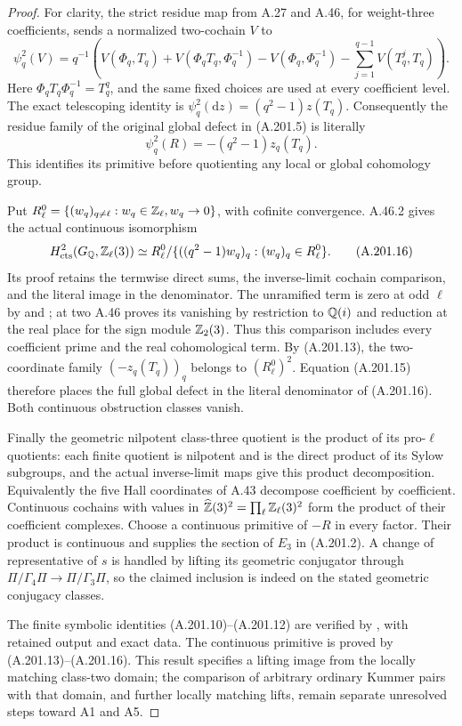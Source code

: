\begin{proof}
For clarity, the strict residue map from A.27 and A.46, for
weight-three coefficients, sends a normalized two-cochain
\(V\) to
\[
 \psi_q^2(V)=q^{-1}\left(
 V(\Phi_q,T_q)+V(\Phi_qT_q,\Phi_q^{-1})
 -V(\Phi_q,\Phi_q^{-1})
 -\sum_{j=1}^{q-1}V(T_q^j,T_q)\right).
\tag{A.201.14}
\]
Here \(\Phi_qT_q\Phi_q^{-1}=T_q^q\), and the same
fixed choices are used at every coefficient level.  The exact
telescoping identity is
\(\psi_q^2(\mathrm dz)=(q^2-1)z(T_q)\).
Consequently the residue family of the original global defect
in (A.201.5) is literally
\[
          \psi_q^2(R)=-(q^2-1)z_q(T_q).
\tag{A.201.15}
\]
This identifies its primitive before quotienting any local or
global cohomology group.

Put \(R_\ell^0=\{(w_q)_{q\ne\ell}:w_q\in\mathbb Z_\ell,
w_q\to0\}\), with cofinite convergence.  A.46.2 gives the
actual continuous isomorphism
\[
 H^2_{\rm cts}(G_\mathbb Q,\mathbb Z_\ell(3))
 \simeq R_\ell^0/
       \{((q^2-1)w_q)_q:(w_q)_q\in R_\ell^0\}.
\tag{A.201.16}
\]
Its proof retains the termwise direct sums, the inverse-limit
cochain comparison, and the literal image in the denominator.
The unramified term is zero at odd \(\ell\) by
\cite[VI, Theorem 8.2, with \(n=4\)]{Weibel2013} and
\cite[Theorem 0.1]{BIR_Rognes2000}; at two A.46 proves its
vanishing by restriction to \(\mathbb Q(i)\) and reduction at the
real place for the sign module \(\mathbb Z_2(3)\).  Thus this
comparison includes every coefficient prime and the real
cohomological term.
By (A.201.13), the two-coordinate family \((-z_q(T_q))_q\)
belongs to \((R_\ell^0)^2\).  Equation (A.201.15) therefore
places the full global defect in the literal denominator of
(A.201.16).  Both continuous obstruction classes vanish.

Finally the geometric nilpotent class-three quotient is the
product of its pro-\(\ell\) quotients: each finite quotient
is nilpotent and is the direct product of its Sylow subgroups,
and the actual inverse-limit maps give this product decomposition.
Equivalently the five Hall coordinates of A.43 decompose
coefficient by coefficient.  Continuous cochains with values
in \(\widehat{\mathbb Z}(3)^2=\prod_\ell\mathbb Z_\ell(3)^2\) form the
product of their coefficient complexes.  Choose a continuous
primitive of \(-R\) in every factor.  Their product is
continuous and supplies the section of \(E_3\) in (A.201.2).
A change of representative of \(s\) is handled by lifting its
geometric conjugator through \(\Pi/\Gamma_4\Pi\to
\Pi/\Gamma_3\Pi\), so the claimed inclusion is indeed on
the stated geometric conjugacy classes.

The finite symbolic identities (A.201.10)--(A.201.12) are
verified by
, with
retained output and exact data.  The continuous primitive is
proved by (A.201.13)--(A.201.16).  This result specifies a
lifting image from the locally matching class-two domain;
the comparison of arbitrary ordinary Kummer pairs with that
domain, and further locally matching lifts, remain separate
unresolved steps toward A1 and A5.
\end{proof}
